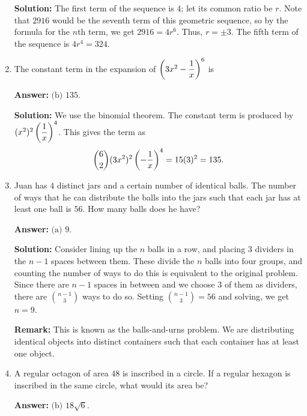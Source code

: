 \documentclass[11pt,paper=letter]{scrartcl}
\begin{document}
\begin{enumerate}[left=0pt]
\textbf{Solution:} The first term of the sequence is $4$; let its common ratio be $r$. Note that $2916$ would be the seventh term of this geometric sequence, so by the formula for the $n$th term, we get $2916 = 4r^6$. Thus, $r = \pm 3$. The fifth term of the sequence is $4r^4 = 324$.

\item The constant term in the expansion of $\left( 3x^2 - \dfrac1x \right)^6$ is


\textbf{Answer:} $\boxed{\text{(b) }135}$.

\textbf{Solution:} We use the binomial theorem. The constant term is produced by $(x^2)^2\left( \dfrac1x \right)^4$. This gives the term as $$\binom{6}{2}(3x^2)^2\left( -\dfrac1x \right)^4 = 15(3)^2 = 135.$$

\item Juan has $4$ distinct jars and a certain number of identical balls. The number of ways that he can distribute the balls into the jars such that each jar has at least one ball is $56$. How many balls does he have?


\textbf{Answer:} $\boxed{\text{(a) }9}$.

\textbf{Solution:} Consider lining up the $n$ balls in a row, and placing $3$ dividers in the $n-1$ spaces between them. These divide the $n$ balls into four groups, and counting the number of ways to do this is equivalent to the original problem. Since there are $n-1$ spaces in between and we choose $3$ of them as dividers, there are $\binom{n-1}{3}$ ways to do so. Setting $\binom{n-1}{3} = 56$ and solving, we get $n = 9$.

\textbf{Remark:} This is known as the balls-and-urns problem. We are distributing identical objects into distinct containers such that each container has at least one object. 

\item A regular octagon of area $48$ is inscribed in a circle. If a regular hexagon is inscribed in the same circle, what would its area be?


\textbf{Answer:} $\boxed{\text{(b) }18\sqrt6}$.


\end{enumerate}
\end{document}
